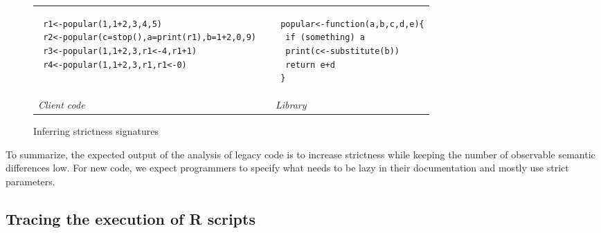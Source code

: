 \documentclass[review,creen,acmsmall]{acmart}
\begin{document}
\begin{figure}[!h]
\begin{tabular}{lll}
  \begin{minipage}{7cm}
\begin{lstlisting}
 r1<-popular(1,1+2,3,4,5)
 r2<-popular(c=stop(),a=print(r1),b=1+2,0,9)
 r3<-popular(1,1+2,3,r1<-4,r1+1)
 r4<-popular(1,1+2,3,r1,r1<-0)
\end{lstlisting}
\end{minipage}
&&
\begin{minipage}{5cm}
\begin{lstlisting}
 popular<-function(a,b,c,d,e){
  if (something) a
  print(c<-substitute(b))
  return e+d
 }
\end{lstlisting}
\end{minipage}\\
\it Client code&& \it Library
\end{tabular}%
\caption{Inferring strictness signatures}\label{iss}
\end{figure}

To summarize, the expected output of the analysis of legacy code is to increase
strictness while keeping the number of observable semantic differences low. For
new code, we expect programmers to specify what needs to be lazy in their
documentation and mostly use strict parameters.

\subsection{Tracing the execution of R scripts}
\end{document}
